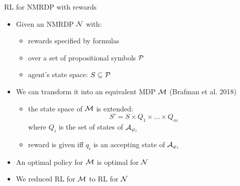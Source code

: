 \documentclass{beamer}
\begin{document}
\begin{frame}{RL for NMRDP with \LLf rewards}
	\begin{itemize}
		\item Given an NMRDP $\mathcal{N}$ with:
		\begin{itemize}
			\item rewards specified by \LLf formulas 
			\item over a set of propositional symbols $\mathcal{P}$
			\item agent’s state space: $S \subseteq \mathcal{P}$
		\end{itemize}
		\item 	We can transform it into an equivalent MDP $\mathcal{M}$ (Brafman et al. 2018)
		\begin{itemize}
			\item the state space of $\mathcal{M}$ is extended:\\
					\[S' = S \times Q_1 \times \dots \times Q_m\]
				where $Q_i$ is the set of states of $\mathcal{A}_{\varphi_i}$
				
			\item 	reward is given iff $q_i$ is an accepting state of $\mathcal{A}_{\varphi_i}$
		\end{itemize}

		\item An optimal policy for $\mathcal{M}$ is optimal for $\mathcal{N}$
		\item We reduced RL for $\mathcal{M}$ to RL for $\mathcal{N}$

		
	\end{itemize}
	
	
\end{frame}
\end{document}
